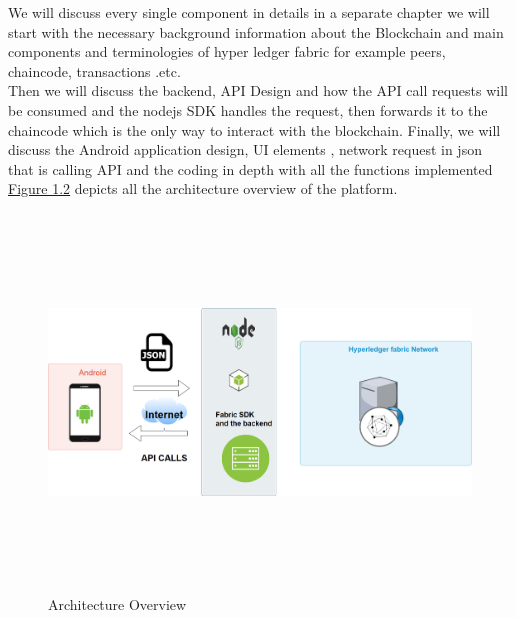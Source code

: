 \noindent We will discuss every single component in details in a separate chapter we will start with the necessary background information about the Blockchain and main components and terminologies of hyper ledger fabric for example peers, chaincode, transactions .etc. \\ Then we will discuss the backend, API Design  and how the API call requests will be consumed and the nodejs SDK handles the request, then forwards it to the chaincode which is the only way to interact with the blockchain.
Finally, we will discuss the Android application design, UI elements , network request in json that is calling API and the coding in depth with all the functions implemented \hyperref[fig:architecture]{Figure 1.2} depicts all the architecture overview of the platform. 
\begin{figure}[H]
	\includegraphics[width=15cm,height=10cm]{images/architecture.png}
	\caption{Architecture Overview}
	\label{fig:architecture}
	\end{figure}

      

 


      
